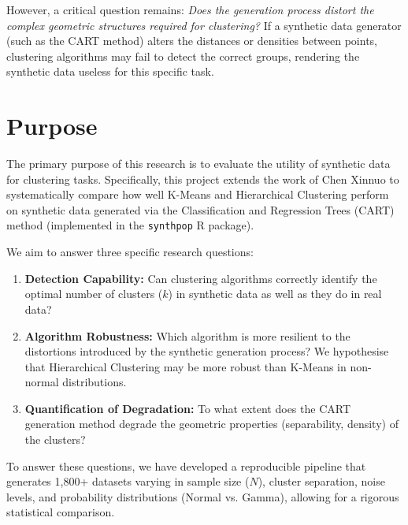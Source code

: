 However, a critical question remains: \textit{Does the generation process distort the complex geometric structures required for clustering?} If a synthetic data generator (such as the CART method) alters the distances or densities between points, clustering algorithms may fail to detect the correct groups, rendering the synthetic data useless for this specific task.

\section{Purpose}
\label{sec:purpose}
The primary purpose of this research is to evaluate the utility of synthetic data for clustering tasks. Specifically, this project extends the work of Chen Xinnuo \cite{chen2025} to systematically compare how well K-Means and Hierarchical Clustering perform on synthetic data generated via the Classification and Regression Trees (CART) method (implemented in the \texttt{synthpop} R package).

We aim to answer three specific research questions:
\begin{enumerate}
  \item \textbf{Detection Capability:} Can clustering algorithms correctly identify the optimal number of clusters ($k$) in synthetic data as well as they do in real data?
  \item \textbf{Algorithm Robustness:} Which algorithm is more resilient to the distortions introduced by the synthetic generation process? We hypothesise that Hierarchical Clustering may be more robust than K-Means in non-normal distributions.
  \item \textbf{Quantification of Degradation:} To what extent does the CART generation method degrade the geometric properties (separability, density) of the clusters?
\end{enumerate}

To answer these questions, we have developed a reproducible pipeline that generates 1,800+ datasets varying in sample size ($N$), cluster separation, noise levels, and probability distributions (Normal vs. Gamma), allowing for a rigorous statistical comparison.

